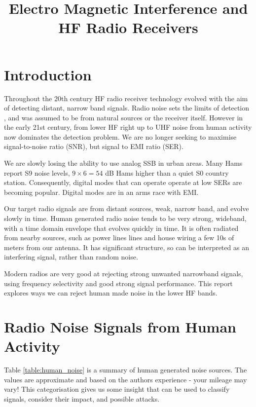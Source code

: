 \documentclass{article}
\begin{document}
\title{Electro Magnetic Interference and HF Radio Receivers}
\maketitle

\section{Introduction}
 
Throughout the 20th century HF radio receiver technology evolved with the aim of detecting distant, narrow band signals.  Radio noise sets the limits of detection \cite{itu372}, and was assumed to be from natural sources or the receiver itself. However in the early 21st century, from lower HF right up to UHF noise from human activity now dominates the detection problem.  We are no longer seeking to maximise signal-to-noise ratio (SNR), but signal to EMI ratio (SER).

We are slowly losing the ability to use analog SSB in urban areas.  Many Hams report S9 noise levels, $9 \times 6 = 54$ dB Hams higher than a quiet S0 country station.  Consequently, digital modes that can operate operate at low SERs are becoming popular.  Digital modes are in an arms race with EMI.

Our target radio signals are from distant sources, weak, narrow band, and evolve slowly in time. Human generated radio noise tends to be very strong, wideband, with a time domain envelope that evolves quickly in time.  It is often radiated from nearby sources, such as power lines lines and house wiring a few 10s of meters from our antenna.  It has significant structure, so can be interpreted as an interfering signal, rather than random noise.

Modern radios are very good at rejecting strong unwanted narrowband signals, using frequency selectivity and good strong signal performance.  This report explores ways we can reject human made noise in the lower HF bands.

\section{Radio Noise Signals from Human Activity}

Table \ref{table:human_noise} is a summary of human generated noise sources.  The values are approximate and based on the authors experience - your mileage may vary!  This categorisation gives us some insight that can be used to classify signals, consider their impact, and possible attacks.
\end{document}
